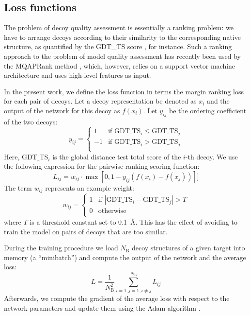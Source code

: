 \subsection{Loss functions}
The problem of decoy quality assessment is essentially a ranking
problem: we have to arrange decoys according to their similarity to
the corresponding native structure, as quantified by the GDT\_TS score
\cite{zemla2001casp4}, for instance. Such a ranking approach to the
problem of model quality assessment has recently been used by the
MQAPRank method \cite{jing2016sorting}, which, however, relies on a
support vector machine architecture and uses high-level features as
input.

In the present work, we define the loss function in terms the margin
ranking loss for each pair of decoys. Let a decoy representation be
denoted as $x_i$ and the output of the network for this decoy as
$f(x_i)$. Let $y_{ij}$ be the ordering coefficient of the two decoys:
$$
y_{ij} = \begin{cases}
               1& \text{if }\text{GDT\_TS}_i \leq \text{GDT\_TS}_j \\
               -1& \text{if }\text{GDT\_TS}_i > \text{GDT\_TS}_j \\
            \end{cases}
$$
%
Here, $\text{GDT\_TS}_i$ is the global distance test total score of
the $i$-th decoy. We use the following expression for the pairwise
ranking scoring function:
$$
L_{ij} = w_{ij} \cdot \max \left[ 0, 1 - y_{ij} \left( f \left( x_i \right) - f \left( x_j \right) \right) \right]]
$$
%
The term $w_{ij}$ represents an example weight:
%
$$
w_{ij} = \begin{cases}
               1& \text{if } \left| \text{GDT\_TS}_i - \text{GDT\_TS}_j \right| > T \\
               0& \text{otherwise} \\ 
            \end{cases}
$$
%
where $T$ is a threshold constant set to 0.1~{\AA}. This has the
effect of avoiding to train the model on pairs of decoys that are too
similar.

During the training procedure we load $N_\text{B}$ decoy structures of
a given target into memory (a ``minibatch'') and compute the output of the
network and the average loss:
$$ L = \frac{1}{N^{2}_\text{B}} \sum_{i=1,j=1, i \neq j}^{N_\text{B}} L_{ij} $$
Afterwards, we compute the gradient of the average loss with respect
to the network parameters and update them using the Adam algorithm
\cite{???}.


